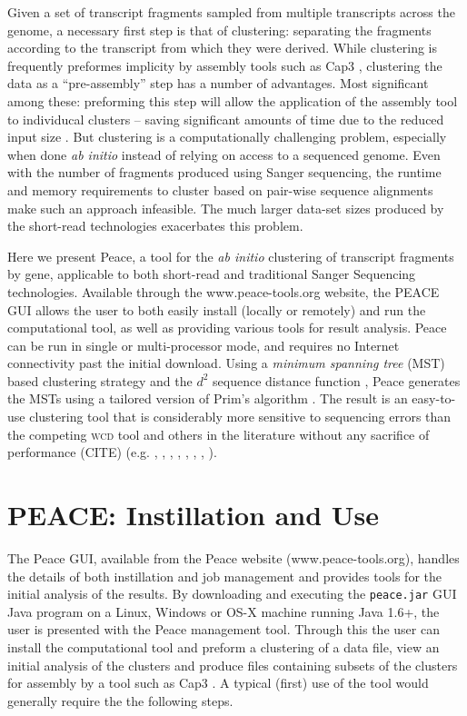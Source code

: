 \documentclass[a4,center,fleqn]{NAR}
\newcommand{\wcd}{\textsc{wcd }}
\begin{document}
Given a set of transcript fragments sampled from multiple transcripts
across the genome, a necessary first step is that of clustering:
separating the fragments according to the transcript from which they
were derived.  While clustering is frequently preformes implicity by
assembly tools such as {\sc Cap3} \cite{Huang99}, clustering the data as a
``pre-assembly'' step has a number of advantages.  Most significant
among these: preforming this step will allow the application of the
assembly tool to individucal clusters -- saving significant amounts of
time due to the reduced input size \cite{Hazelhurst08a}.  But clustering is
a computationally challenging problem, especially when done {\it ab
  initio} instead of relying on access to a sequenced genome.  Even
with the number of fragments produced using Sanger sequencing, the
runtime and memory requirements to cluster based on pair-wise sequence
alignments make such an approach infeasible.  The much larger data-set
sizes produced by the short-read technologies exacerbates this
problem.

Here we present {\sc Peace}, a tool for the {\it ab initio} clustering
of transcript fragments by gene, applicable to both short-read and traditional
Sanger Sequencing technologies.  Available through the
www.peace-tools.org website, the PEACE GUI allows the user
to both easily install (locally or remotely) and run the computational
tool, as well as providing various tools for result analysis. {\sc
  Peace} can be run in single or multi-processor mode, and requires no
Internet connectivity past the initial download.  Using a {\it minimum
  spanning tree} (MST) based clustering strategy \cite{Jain99,Wan08}
and the $d^2$ sequence distance function \cite{Hide94}, {\sc Peace}
generates the MSTs using a tailored version of Prim's algorithm
\cite{Prim57}.  The result is an easy-to-use clustering tool that is considerably
more sensitive to sequencing errors than the competing \wcd tool
\cite{Hazelhurst08a} and others in the literature without any
sacrifice of performance (CITE) (e.g. \cite{Burke99}, \cite{Slater00},
\cite{Huang99}, \cite{Parkinson02}, \cite{Kalyanaraman03},
\cite{Malde03}, \cite{Ptitsyn05}, \cite{Picardi09}).

\section{PEACE: Instillation and Use}

The {\sc Peace} GUI, available from the {\sc Peace} website
(www.peace-tools.org), handles the details of both instillation and
job management and provides tools for the initial analysis of the
results.  By downloading and executing the {\tt peace.jar} GUI Java
program on a Linux, Windows or OS-X machine running Java 1.6+, the
user is presented with the {\sc Peace} management tool.  Through this
the user can install the computational tool and preform a clustering
of a data file, view an initial analysis of the clusters and produce
files containing subsets of the clusters for assembly by a tool such
as {\sc Cap3} \cite{Huang99}.  A typical (first) use of the tool would
generally require the the following steps.
\end{document}
